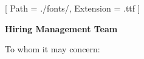 


\renewcommand{\photo}[2]{}

\geometry{
  left=2cm,
  right=2cm,
  top=2cm,
  bottom=2cm
}



\makecvheader

\setmainfont{NotoSans-Regular}[
  Path = ./fonts/,
  Extension = .ttf
]

\vspace{1cm}
\indent\textbf{Hiring Management Team}\\
\indent\textbf{}

\vspace{0.5cm}

\noindent To whom it may concern:

\vspace{0.5cm}

